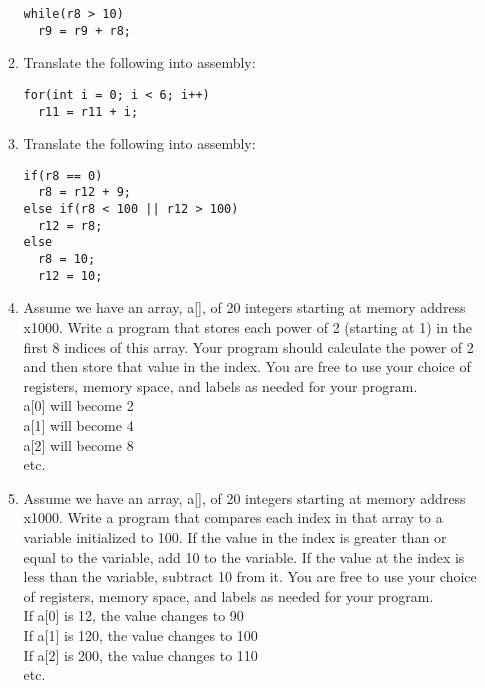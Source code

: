 \documentclass[10pt]{article}
\begin{document}
\begin{itemize}
\begin{enumerate}
\begin{verbatim}
while(r8 > 10)
  r9 = r9 + r8;
    \end{verbatim}
    \vspace{1in}

\item Translate the following into assembly:
    \begin{verbatim}
for(int i = 0; i < 6; i++)
  r11 = r11 + i;
    \end{verbatim}
    \vspace{1in}

\item Translate the following into assembly:
    \begin{verbatim}
if(r8 == 0)
  r8 = r12 + 9;
else if(r8 < 100 || r12 > 100)
  r12 = r8;
else
  r8 = 10;
  r12 = 10;
    \end{verbatim}
    \vspace{1in}

\item Assume we have an array, a[], of 20 integers starting at memory address x1000.  Write a program that stores each power of 2 (starting at 1) in the first 8 indices of this array.  Your program should calculate the power of 2 and then store that value in the index. You are free to use your choice of registers, memory space, and labels as needed for your program.\\ 

a[0] will become 2\\
a[1] will become 4\\
a[2] will become 8\\
etc.

    \vspace{1in}

\item Assume we have an array, a[], of 20 integers starting at memory address x1000.  Write a program that compares each index in that array to a variable initialized to 100.  If the value in the index is greater than or equal to the variable, add 10 to the variable.  If the value at the index is less than the variable, subtract 10 from it. You are free to use your choice of registers, memory space, and labels as needed for your program.\\ 

If a[0] is 12, the value changes to 90\\
If a[1] is 120, the value changes to 100\\
If a[2] is 200, the value changes to 110\\
etc.


\end{enumerate}
\end{itemize}
\end{document}

